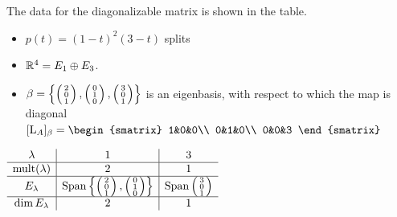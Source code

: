 \begin{example}{}{}
	The data for the diagonalizable matrix 
	is shown in the table.\par
	\begin{minipage}[t]{0.56\linewidth}\vspace{0pt}
		\begin{itemize}
		  \item $p(t)=(1-t)^2(3-t)$ splits
		  \item $\mathbb{R}^4=E_1\oplus E_3$.
		  \item $\beta=\left\{\left(\begin{smallmatrix}2\\0\\1\end{smallmatrix}\right),\left(\begin{smallmatrix}0\\1\\0\end{smallmatrix}\right),\left(\begin{smallmatrix}3\\0\\1\end{smallmatrix}\right)\right\}$ is an eigenbasis, with respect to which the map is diagonal $[\rL_A]_\beta=
			\begin{smatrix}
			  1&0&0\\
			  0&1&0\\
			  0&0&3
		  \end{smatrix}$
		\end{itemize}
	\end{minipage}
	\hfill
	\begin{minipage}[t]{0.42\linewidth}\vspace{0pt}
		\hfill
		\def\arraystretch{1.45}
		$\begin{array}{c|c|c}
			\lambda&1&3\\\hline
			\operatorname{mult}(\lambda)&2&1\\\hline
			E_\lambda&\operatorname{Span}\left\{\left(\begin{smallmatrix}2\\0\\1\end{smallmatrix}\right),\left(\begin{smallmatrix}0\\1\\0\end{smallmatrix}\right)\right\}&\operatorname{Span}\left(\begin{smallmatrix}3\\0\\1\end{smallmatrix}\right)\\\hline
			\dim E_\lambda&2&1
		\end{array}$
	\end{minipage}
\end{example}


